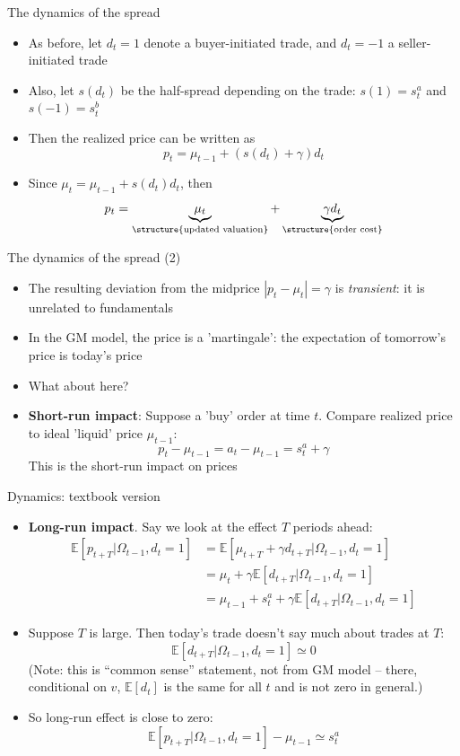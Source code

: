 \documentclass[english,10pt]{beamer}
\begin{document}
\begin{frame}{The dynamics of the spread}
	\begin{itemize}
		\item As before, let $d_{t}=1$ denote a buyer-initiated trade, and $d_{t} = -1$ a seller-initiated trade
		\item Also, let $s(d_{t})$ be the half-spread depending on the trade: $s(1)=s^{a}_{t}$ and $s(-1)=s^{b}_{t}$
		\item Then the realized price can be written as
		\[
		p_{t} = \mu_{t-1} + (s(d_{t}) + \gamma) d_{t}
		\]
		\item Since $\mu_{t} = \mu_{t-1} + s(d_{t}) d_{t}$, then
		\[
		p_{t}  = \underbrace{\mu_{t}}_{\structure{\text{updated valuation}}} + \underbrace{\gamma d_{t}}_{\structure{\text{order cost}}}
		\]
	\end{itemize}
\end{frame}


\begin{frame}{The dynamics of the spread (2)}
	\begin{itemize}
		\item The resulting deviation from the midprice $|p_{t}-\mu_{t}|=\gamma$ is \textit{transient}: it is unrelated to fundamentals
		\item In the GM model, the price is a 'martingale': the expectation of tomorrow's price is today's price
		\item What about here? 
		\item \textbf{Short-run impact}: Suppose a 'buy' order at time $t$. Compare realized price to ideal 'liquid' price $\mu_{t-1}$:
		\[
		p_{t}  - \mu_{t-1} = a_{t} - \mu_{t-1} = s^{a}_{t} + \gamma
		\]
		This is the short-run impact on prices
	\end{itemize}
\end{frame}


\begin{frame}{Dynamics: textbook version}
	\begin{itemize}
		\item \textbf{Long-run impact}. Say we look at the effect $T$ periods ahead:
		\begin{align*}
		\mathbb{E}[p_{t+T}|\Omega_{t-1}, d_{t}=1]
		& = \mathbb{E}[\mu_{t+T}+ \gamma d_{t+T}|\Omega_{t-1}, d_{t}=1] \\
		& = \mu_{t} + \gamma \mathbb{E}[d_{t+T}|\Omega_{t-1}, d_{t}=1] \\
		& = \mu_{t-1} + s^{a}_{t}+ \gamma \mathbb{E}[d_{t+T}|\Omega_{t-1}, d_{t}=1] 
		\end{align*}
		\item Suppose $T$ is large. Then today's trade doesn't say much about trades at $T$:
		\[
		\mathbb{E}[d_{t+T}|\Omega_{t-1}, d_{t}=1]  \simeq 0
		\]
		{\small (Note: this is ``common sense'' statement, not from GM model -- there, conditional on $v$, $\mathbb{E}[d_t]$ is the same for all $t$ and is not zero in general.)}
		\item So long-run effect is close to zero:
		\[
		\mathbb{E}[p_{t+T}|\Omega_{t-1}, d_{t}=1] - \mu_{t-1} \simeq s^{a}_{t}
		\]
	\end{itemize}
\end{frame}
\end{document}
